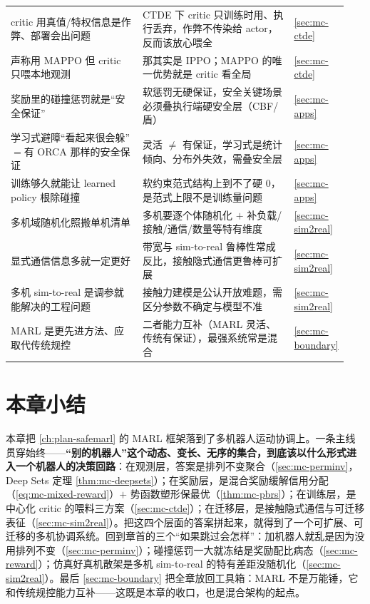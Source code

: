\begin{table}[H]
\begin{tabular}{p{0.40\linewidth}p{0.46\linewidth}p{0.08\linewidth}}
critic 用真值/特权信息是作弊、部署会出问题 & CTDE 下 critic 只训练时用、执行丢弃，作弊不传染给 actor，反而该放心喂全 & \cref{sec:mc-ctde} \\
声称用 MAPPO 但 critic 只喂本地观测 & 那其实是 IPPO；MAPPO 的唯一优势就是 critic 看全局 & \cref{sec:mc-ctde} \\
奖励里的碰撞惩罚就是“安全保证” & 软惩罚无硬保证，安全关键场景必须叠执行端硬安全层（CBF/盾） & \cref{sec:mc-apps} \\
学习式避障“看起来很会躲”$=$有 ORCA 那样的安全保证 & 灵活 $\neq$ 有保证，学习式是统计倾向、分布外失效，需叠安全层 & \cref{sec:mc-apps} \\
训练够久就能让 learned policy 根除碰撞 & 软约束范式结构上到不了硬 $0$，是范式上限不是训练量问题 & \cref{sec:mc-apps} \\
多机域随机化照搬单机清单 & 多机要逐个体随机化 $+$ 补负载/接触/通信/数量等特有维度 & \cref{sec:mc-sim2real} \\
显式通信信息多就一定更好 & 带宽与 sim-to-real 鲁棒性常成反比，接触隐式通信更鲁棒可扩展 & \cref{sec:mc-sim2real} \\
多机 sim-to-real 是调参就能解决的工程问题 & 接触力建模是公认开放难题，需区分参数不确定与模型不准 & \cref{sec:mc-sim2real} \\
MARL 是更先进方法、应取代传统规控 & 二者能力互补（MARL 灵活、传统有保证），最强系统常是混合 & \cref{sec:mc-boundary} \\
\bottomrule
\end{tabular}
\end{table}

\section*{本章小结}

本章把 \cref{ch:plan-safemarl} 的 MARL 框架落到了多机器人运动协调上。一条主线贯穿始终——\textbf{“别的机器人”这个动态、变长、无序的集合，到底该以什么形式进入一个机器人的决策回路}：在观测层，答案是排列不变聚合（\cref{sec:mc-perminv}，Deep Sets 定理 \cref{thm:mc-deepsets}）；在奖励层，是混合奖励缓解信用分配（\cref{eq:mc-mixed-reward}）$+$ 势函数塑形保最优（\cref{thm:mc-pbrs}）；在训练层，是中心化 critic 的喂料三方案（\cref{sec:mc-ctde}）；在迁移层，是接触隐式通信与可迁移表征（\cref{sec:mc-sim2real}）。把这四个层面的答案拼起来，就得到了一个可扩展、可迁移的多机协调系统。回到章首的三个“如果跳过会怎样”：加机器人就乱是因为没用排列不变（\cref{sec:mc-perminv}）；碰撞惩罚一大就冻结是奖励配比病态（\cref{sec:mc-reward}）；仿真好真机散架是多机 sim-to-real 的特有差距没随机化（\cref{sec:mc-sim2real}）。最后 \cref{sec:mc-boundary} 把全章放回工具箱：MARL 不是万能锤，它和传统规控能力互补——这既是本章的收口，也是混合架构的起点。

